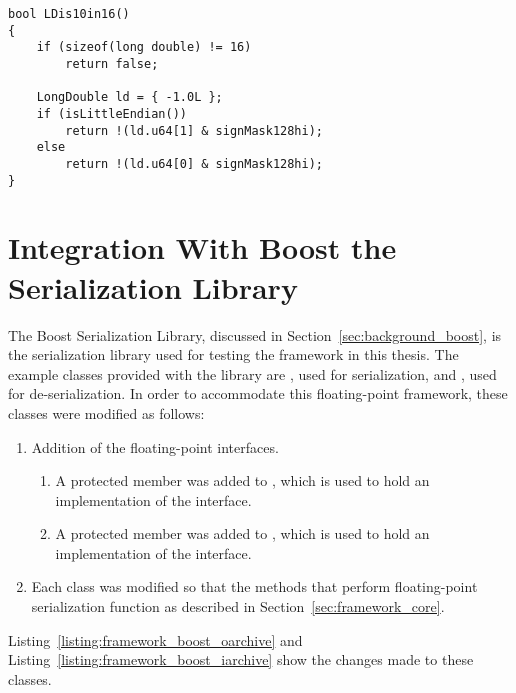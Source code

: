 \noindent
\begin{minipage}{\linewidth}
\begin{singlespace}
\begin{lstlisting}[caption=The \code{long double} type identifier utility function., label=listing:framework_ldtype]
bool LDis10in16()
{
    if (sizeof(long double) != 16)
        return false;

    LongDouble ld = { -1.0L };
    if (isLittleEndian())
        return !(ld.u64[1] & signMask128hi);
    else
        return !(ld.u64[0] & signMask128hi);
}
\end{lstlisting}
\end{singlespace}
\end{minipage}

\section{Integration With Boost the Serialization Library}
\label{sec:framework_integration}
The Boost Serialization Library, discussed in Section~\ref{sec:background_boost}, is the serialization library used for testing the framework in this thesis. The example  classes provided with the library are , used for serialization, and , used for de-serialization. In order to accommodate this floating-point framework, these classes were modified as follows:

\begin{enumerate}
  \item Addition of the floating-point interfaces.
  \begin{enumerate}
    \item A protected member was added to , which is used to hold an implementation of the  interface.
    \item A protected member was added to , which is used to hold an implementation of the  interface.
  \end{enumerate}
  
  \item Each class was modified so that the methods that perform floating-point serialization function as described in Section~\ref{sec:framework_core}.
\end{enumerate}

Listing~\ref{listing:framework_boost_oarchive} and Listing~\ref{listing:framework_boost_iarchive} show the changes made to these classes.

